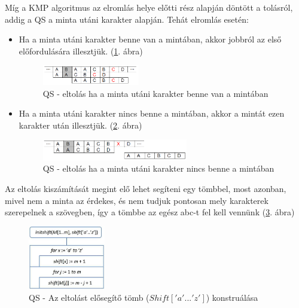 \documentclass[margin=0px]{article}
\begin{document}
    Míg a KMP algoritmus az elromlás helye előtti rész alapján döntött a tolásról, addig a QS a minta utáni karakter alapján. Tehát elromlás esetén:
	\begin{itemize}
        \item Ha a minta utáni karakter benne van a mintában, akkor jobbról az első előfordulására illesztjük. (\ref{fig:BoyerMoore_shift1}. ábra)
				\begin{figure}[H]
					\centering
					\includegraphics[width=0.4\textwidth]{img/BoyerMoore_shift1.png}
					\caption{QS - eltolás ha a minta utáni karakter benne van a mintában}
					\label{fig:BoyerMoore_shift1}
				\end{figure}
				\item Ha a minta utáni karakter nincs benne a mintában, akkor a mintát ezen karakter után illesztjük. (\ref{fig:BoyerMoore_shift2}. ábra)
				\begin{figure}[H]
					\centering
					\includegraphics[width=0.6\textwidth]{img/BoyerMoore_shift2.png}
					\caption{QS - eltolás ha a minta utáni karakter nincs benne a mintában}
					\label{fig:BoyerMoore_shift2}
				\end{figure}
			\end{itemize}
			
    \noindent Az eltolás kiszámítását megint elő lehet segíteni egy tömbbel, most azonban, mivel nem a minta az érdekes, és nem tudjuk pontosan mely karakterek szerepelnek a szövegben, így a tömbbe az egész abc-t fel kell vennünk (\ref{fig:BoyerMoore_initshift}. ábra)
			
			\begin{figure}[H]
				\centering
				\includegraphics[width=0.3\textwidth]{img/QS_Init_Shift.png}
				\caption{QS - Az eltolást elősegítő tömb ($Shift['a'...'z']$) konstruálása}
				\label{fig:BoyerMoore_initshift}
			\end{figure}
			
\end{document}
